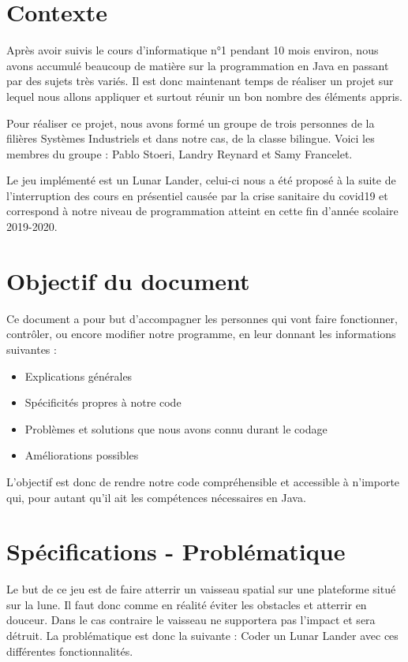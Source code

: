 \section{Contexte}
Après avoir suivis le cours d’informatique n°1 pendant 10 mois environ, nous avons accumulé beaucoup de matière sur la programmation en Java en passant par des sujets très variés. Il est donc maintenant temps de réaliser un projet sur lequel nous allons appliquer et surtout réunir un bon nombre des éléments appris.

Pour réaliser ce projet, nous avons formé un groupe de trois personnes de la filières Systèmes Industriels et dans notre cas, de la classe bilingue. Voici les membres du groupe : Pablo Stoeri, Landry Reynard et Samy Francelet.

Le jeu implémenté est un Lunar Lander, celui-ci nous a été proposé à la suite de l’interruption des cours en présentiel causée par la crise sanitaire du covid19 et correspond à notre niveau de programmation atteint en cette fin d’année scolaire 2019-2020.

\section{Objectif du document}
Ce document a pour but d’accompagner les personnes qui vont faire fonctionner, contrôler, ou encore modifier notre programme, en leur donnant les informations suivantes :
\begin{itemize}
\item	Explications générales
\item	Spécificités propres à notre code
\item	Problèmes et solutions que nous avons connu durant le codage
\item	Améliorations possibles
\end{itemize}
L’objectif est donc de rendre notre code compréhensible et accessible à n’importe qui, pour autant qu’il ait les compétences nécessaires en Java.


\section{Spécifications - Problématique}
Le but de ce jeu est de faire atterrir un vaisseau spatial sur une plateforme situé sur la lune. Il faut donc comme en réalité éviter les obstacles et atterrir en douceur. Dans le cas contraire le vaisseau ne supportera pas l’impact et sera détruit.
La problématique est donc la suivante : Coder un Lunar Lander avec ces différentes fonctionnalités.

